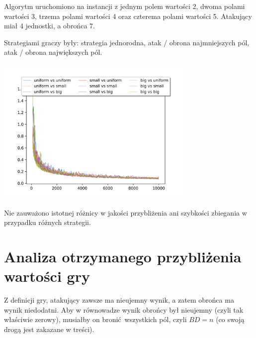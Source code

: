 \documentclass{article}
\begin{document}
Algorytm uruchomiono na instancji z jednym polem wartości 2, dwoma polami
wartości 3, trzema polami wartości 4 oraz czterema polami wartości 5. Atakujący
miał 4 jednostki, a obrońca 7.

Strategiami graczy były: strategia jednorodna, atak / obrona najmniejszych pól,
atak / obrona największych pól.

\begin{center}
\includegraphics[width=360px]{./results/different_strats.png}
\end{center}

Nie zauważono istotnej różnicy w jakości przybliżenia ani szybkości zbiegania
w przypadku różnych strategii.

\section{Analiza otrzymanego przybliżenia wartości gry}

Z definicji gry, atakujący zawsze ma nieujemny wynik, a zatem obrońca ma wynik
niedodatni. Aby w równowadze wynik obrońcy był nieujemny (czyli tak właściwie
zerowy), musiałby on bronić wszystkich pól, czyli $BD = n$ (co swoją drogą
jest zakazane w treści).
\end{document}
